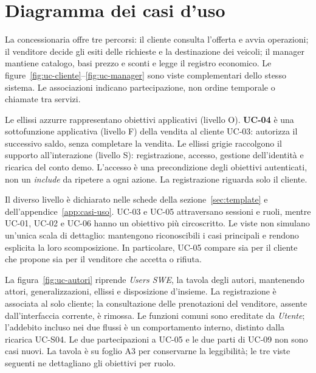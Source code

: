 \def\UrlBreaks{\do\a\do\b\do\c\do\d\do\e\do\f\do\g\do\h\do\i\do\j\do\k\do\l\do\m\do\n\do\o\do\p\do\q\do\r\do\s\do\t\do\u\do\v\do\w\do\x\do\y\do\z\do\A\do\B\do\C\do\D\do\E\do\F\do\G\do\H\do\I\do\J\do\K\do\L\do\M\do\N\do\O\do\P\do\Q\do\R\do\S\do\T\do\U\do\V\do\W\do\X\do\Y\do\Z}
\section{Diagramma dei casi d'uso}\label{sec:casi-uso}
La concessionaria offre tre percorsi: il cliente consulta l'offerta e avvia
operazioni; il venditore decide gli esiti delle richieste e la destinazione
dei veicoli; il manager mantiene catalogo, basi prezzo e sconti e legge il
registro economico. Le figure~\ref{fig:uc-cliente}--\ref{fig:uc-manager}
sono viste complementari dello stesso sistema. Le associazioni indicano
partecipazione, non ordine temporale o chiamate tra servizi.

Le ellissi azzurre rappresentano obiettivi applicativi (livello O).
\textbf{UC-04} \`e una sottofunzione applicativa (livello F) della vendita
al cliente UC-03: autorizza il successivo saldo, senza completare la vendita.
Le ellissi grigie raccolgono il supporto all'interazione (livello S):
registrazione, accesso, gestione dell'identit\`a e ricarica del conto demo.
L'accesso \`e una precondizione degli obiettivi autenticati, non un
\emph{include} da ripetere a ogni azione. La registrazione riguarda solo il cliente.

Il diverso livello è dichiarato nelle schede della sezione~\ref{sec:template} e dell'appendice~\ref{app:casi-uso}.
UC-03 e UC-05 attraversano sessioni e ruoli, mentre UC-01, UC-02 e UC-06
hanno un obiettivo pi\`u circoscritto. Le viste non simulano un'unica scala
di dettaglio: mantengono riconoscibili i casi principali e rendono esplicita
la loro scomposizione. In particolare, UC-05 compare sia per il cliente che
propone sia per il venditore che accetta o rifiuta.

La figura~\ref{fig:uc-autori} riprende \emph{Users SWE}, la tavola degli
autori, mantenendo attori, generalizzazioni, ellissi e disposizione d'insieme.
La registrazione \`e associata al solo cliente; la consultazione delle
prenotazioni del venditore, assente dall'interfaccia corrente, \`e rimossa.
Le funzioni comuni sono ereditate da \emph{Utente}; l'addebito incluso nei
due flussi \`e un comportamento interno, distinto dalla ricarica UC-S04.
Le due partecipazioni a UC-05 e le due parti di UC-09 non sono casi nuovi.
La tavola \`e su foglio A3 per conservarne la leggibilit\`a; le tre viste
seguenti ne dettagliano gli obiettivi per ruolo.

